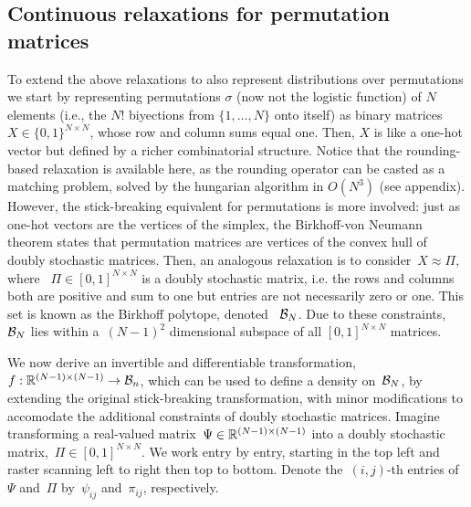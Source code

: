 \documentclass{article}
\begin{document}
\subsection{Continuous relaxations for permutation matrices}
\label{sub:permutation}
To extend the above relaxations to also represent distributions over permutations we start by representing permutations $\sigma$ (now not the logistic function) of $N$ elements (i.e., the $N!$ biyections from $\{1,\ldots,N\}$ onto itself) as binary matrices $X\in \{0,1\}^ {N \times N}$, whose row and column sums equal one. Then, $X$ is like a one-hot vector but defined by a richer combinatorial structure. Notice that the rounding-based relaxation is available here, as the rounding operator can be casted as a matching problem, solved by the hungarian algorithm in $O(N^3)$ (see appendix). However, the stick-breaking equivalent for permutations is more involved: just as one-hot vectors are the vertices of the simplex, the Birkhoff-von Neumann
theorem states that permutation matrices are vertices of the convex
hull of doubly stochastic matrices. Then, an analogous relaxation is to consider~$X \approx {\Pi}$,
where ~${\Pi} \in [0,1]^{N \times N}$ is a doubly stochastic matrix,
i.e. the rows and columns both are positive and sum to one but entries are not necessarily zero or one. This set is known as the Birkhoff polytope, denoted ~$\mathcal{B}_N$. Due to these constraints, ~$\mathcal{B}_N$ lies within a~$(N-1)^2$ dimensional subspace of all $[0,1]^{N \times N}$ matrices.
 

We now derive an invertible and differentiable transformation,~$f: \mathbb{R}^{(N-1) \times (N-1)} \to \mathcal{B}_n$,
which can be used to define a density on~$\mathcal{B}_N$, by extending the original stick-breaking transformation, with minor
modifications to accomodate the additional constraints of doubly stochastic
matrices. Imagine transforming a real-valued matrix~$\Psi \in \mathbb{R}^{(N-1) \times (N-1)}$
into a doubly stochastic matrix,~${\Pi} \in [0,1]^{N \times N}$.
We work entry by entry, starting in the top left
and raster scanning left to right then top to bottom. Denote the~$(i,j)$-th entries
of~$\Psi$ and~${\Pi}$ by~$\psi_{ij}$ and~${\pi}_{ij}$, respectively.
\end{document}
